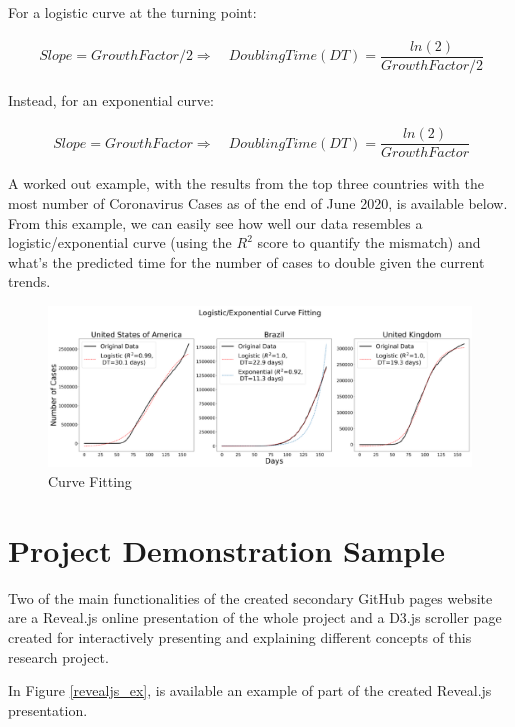 \begin{appendices}
For a logistic curve at the turning point: 

\useshortskip
\begin{align}
\ Slope = Growth Factor/2 \Rightarrow\quad Doubling Time (DT) = \dfrac{ln(2)}{Growth Factor/2}
\end{align}
\useshortskip

Instead, for an exponential curve:

\useshortskip
\begin{align}
\ Slope = Growth Factor \Rightarrow\quad Doubling Time (DT) = \dfrac{ln(2)}{Growth Factor}
\end{align}
\useshortskip

A worked out example, with the results from the top three countries with the most number of Coronavirus Cases as of the end of June 2020, is available below. From this example, we can easily see how well our data resembles a logistic/exponential curve (using the $R^{2}$ score to quantify the mismatch) and what's the predicted time for the number of cases to double given the current trends.

\begin{figure}[ht!]%
    \centering
    \includegraphics[width=1\linewidth]{latex/images/fitting.pdf}
    \caption{Curve Fitting}
\end{figure}

\clearpage

\section{Project Demonstration Sample}
\label{dem}

Two of the main functionalities of the created secondary GitHub pages website are a Reveal.js online presentation of the whole project and a D3.js scroller page created for interactively presenting and explaining different concepts of this research project.

In Figure \ref{revealjs_ex}, is available an example of part of the created Reveal.js presentation.


\end{appendices}
